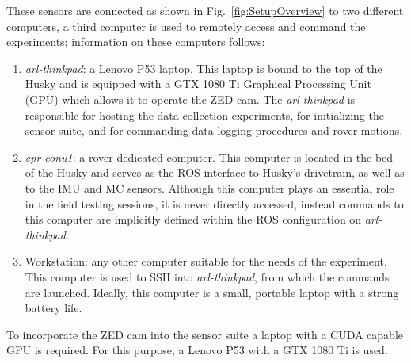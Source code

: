 \documentclass[
	12pt, %
]{fphw}
\begin{document}
These sensors are connected as shown in Fig.~\ref{fig:SetupOverview} to two different computers, a third computer is used to remotely access and command the experiments; information on these computers follows:
\begin{enumerate}
	\item \emph{arl-thinkpad}: a Lenovo P53 laptop. This laptop is bound to the top of the Husky and is equipped with a GTX 1080 Ti Graphical Processing Unit (GPU) which allows it to operate the ZED cam. The \emph{arl-thinkpad} is responsible for hosting the data collection experiments, for initializing the sensor suite, and for commanding data logging procedures and rover motions.
	\item \emph{cpr-conu1}: a rover dedicated computer. This computer is located in the bed of the Husky and serves as the ROS interface to Husky's drivetrain, as well as to the IMU and MC sensors. Although this computer plays an essential role in the field testing sessions, it is never directly accessed, instead commands to this computer are implicitly defined within the ROS configuration on \emph{arl-thinkpad}.
	\item Workstation: any other computer suitable for the needs of the experiment. This computer is used to SSH into \emph{arl-thinkpad}, from which the commands are launched. Ideally, this computer is a small, portable laptop with a strong battery life.
\end{enumerate}


To incorporate the ZED cam into the sensor suite a laptop with a CUDA capable GPU is required. For this purpose, a Lenovo P53 with a GTX 1080 Ti is used.
\end{document}
